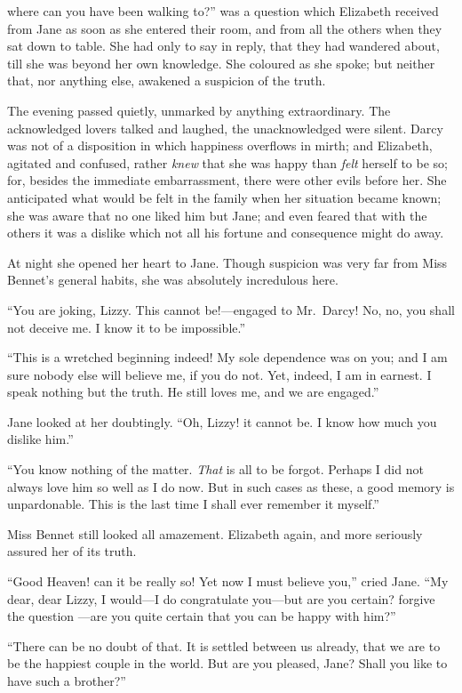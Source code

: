  where can you have been walking to?'' was a
question which Elizabeth received from Jane as soon as she
entered their room, and from all the others when they sat down
to table.  She had only to say in reply, that they had wandered
about, till she was beyond her own knowledge.  She coloured as
she spoke; but neither that, nor anything else, awakened a
suspicion of the truth.

The evening passed quietly, unmarked by anything extraordinary.
The acknowledged lovers talked and laughed, the unacknowledged
were silent.  Darcy was not of a disposition in which happiness
overflows in mirth; and Elizabeth, agitated and confused, rather
\emph{knew} that she was happy than \emph{felt} herself to be so; for, besides
the immediate embarrassment, there were other evils before her.
She anticipated what would be felt in the family when her
situation became known; she was aware that no one liked him but
Jane; and even feared that with the others it was a dislike
which not all his fortune and consequence might do away.

At night she opened her heart to Jane.  Though suspicion was
very far from Miss Bennet's general habits, she was absolutely
incredulous here.

``You are joking, Lizzy.  This cannot be!---engaged to Mr.\ Darcy!
No, no, you shall not deceive me.  I know it to be impossible.''

``This is a wretched beginning indeed!  My sole dependence was
on you; and I am sure nobody else will believe me, if you do
not.  Yet, indeed, I am in earnest.  I speak nothing but the
truth.  He still loves me, and we are engaged.''

Jane looked at her doubtingly.  ``Oh, Lizzy! it cannot be.
I know how much you dislike him.''

``You know nothing of the matter.  \emph{That} is all to be forgot.
Perhaps I did not always love him so well as I do now.  But in
such cases as these, a good memory is unpardonable.  This is
the last time I shall ever remember it myself.''

Miss Bennet still looked all amazement.  Elizabeth again, and
more seriously assured her of its truth.

``Good Heaven! can it be really so!  Yet now I must believe
you,'' cried Jane.  ``My dear, dear Lizzy, I would---I do
congratulate you---but are you certain? forgive the question
---are you quite certain that you can be happy with him?''

``There can be no doubt of that.  It is settled between us
already, that we are to be the happiest couple in the world.
But are you pleased, Jane?  Shall you like to have such a
brother?''

